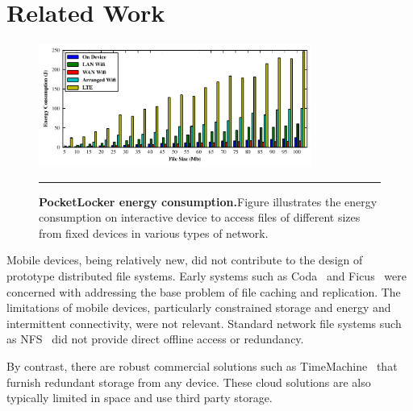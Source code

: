 
\section{Related Work}
\label{sec-related}

\begin{figure}[t]
  \centering
  \includegraphics[width=0.8\textwidth]{./figures/energyconsumption.pdf}
  
  \vspace*{-0.1in}

  \caption{\small \textbf{PocketLocker energy consumption.}Figure illustrates the energy
  consumption on interactive device to access files of different sizes from
fixed devices in various types of network.}

  \label{fig-evaluation-energy}
  
  \vspace*{0.05in}

  \hrule

  \vspace*{-0.2in}

\end{figure}
Mobile devices, being relatively new, did not contribute to the design of
prototype distributed file systems.  Early systems such as
Coda~\cite{kistler1992disconnected} and Ficus~\cite{guy1990implementation} were
concerned with addressing the base problem of file caching and replication.
The limitations of mobile devices, particularly constrained storage and energy
and intermittent connectivity, were not relevant.  Standard network file
systems such as NFS~\cite{nowicki1989nfs} did not provide direct offline access
or redundancy.

By contrast, there are robust commercial solutions such as
TimeMachine~\cite{timemachine} that furnish redundant storage from any device.
These cloud solutions are also typically limited in space and use third party
storage.

